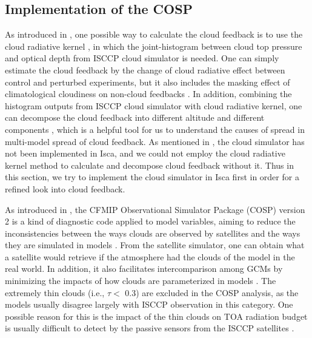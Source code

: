 \subsection{Implementation of the COSP}
\label{sec:implementation_of_cosp}

As introduced in , one possible way to calculate the cloud feedback is to use the cloud radiative kernel \citep{Zelinka2012computing1,Zelinka2012computing2}, in which the joint-histogram between cloud top pressure and optical depth from ISCCP cloud simulator \citep{Klein1999validation,Webb2001combining} is needed. One can simply estimate the cloud feedback by the change of cloud radiative effect between control and perturbed experiments, but it also includes the masking effect of climatological cloudiness on non-cloud feedbacks \citep{Soden2004}. In addition, combining the histogram outputs from ISCCP cloud simulator with cloud radiative kernel, one can decompose the cloud feedback into  different altitude and different components \citep{Zelinka2012computing2,Zelinka2016insights}, which is a helpful tool for us to understand the causes of spread in multi-model spread of cloud feedback. As mentioned in , the cloud simulator has not been implemented in Isca, and we could not employ the cloud radiative kernel method to calculate and decompose cloud feedback without it. Thus in this section, we try to implement the cloud simulator in Isca first in order for a refined look into cloud feedback.

As introduced in , the CFMIP Observational Simulator Package (COSP) version 2 \citep{Swales2018} is a kind of diagnostic code applied to model variables, aiming to reduce the inconsistencies between the ways clouds are observed by satellites and the ways they are simulated in models \citep{BodasSalcedo2011}. From the satellite simulator, one can obtain what a satellite would retrieve if the atmosphere had the clouds of the model in the real world. In addition, it also facilitates intercomparison among GCMs by minimizing the impacts of how clouds are parameterized in models \citep[e.g.][]{Klein2013climate}. The extremely thin clouds (i.e., $\tau<$ 0.3) are excluded in the COSP analysis, as the models usually disagree largely with ISCCP observation in this category. One possible reason for this is the impact of the thin clouds on TOA radiation budget is usually difficult to detect by the passive sensors from the ISCCP satellites \citep{Klein2013climate}.

